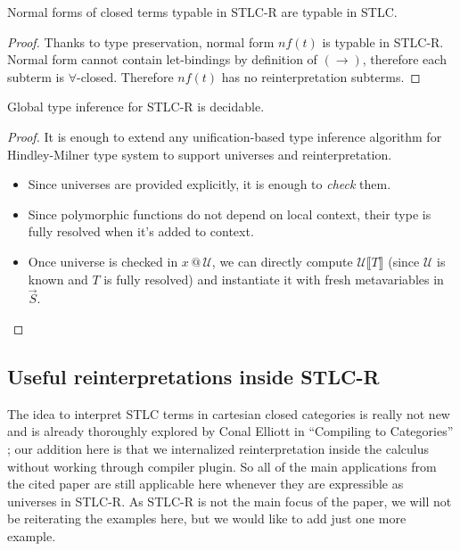 \documentclass[acmsmall, review, screen, authorversion]{acmart}
\begin{document}
\begin{theorem}
    Normal forms of closed terms typable in STLC-R are typable in
    STLC.
\end{theorem}
\begin{proof}
    Thanks to type preservation, normal form $nf(t)$ is typable in
    STLC-R. Normal form cannot contain let-bindings by definition of
    $(\to)$, therefore each subterm is $\forall$-closed. Therefore
    $nf(t)$ has no reinterpretation subterms.
\end{proof}

\begin{theorem}
    Global type inference for STLC-R is decidable.
\end{theorem}
\begin{proof}
    It is enough to extend any unification-based type inference
    algorithm for Hindley-Milner type system to support universes and
    reinterpretation.
    \begin{itemize}
        \item Since universes are provided explicitly, it is enough
            to \textit{check} them.
        \item Since polymorphic functions do not depend on local
            context, their type is fully resolved when it's added to
            context.
        \item Once universe is checked in $x\,@\,\mathcal{U}$, we can
            directly compute $\mathcal{U}\llbracket T\rrbracket$
            (since $\mathcal{U}$ is known and $T$ is fully resolved)
            and instantiate it with fresh metavariables in $\vec{S}$.
    \end{itemize}
\end{proof}

\subsection{Useful reinterpretations inside STLC-R}
\label{STLC-R-applications}

The idea to interpret STLC terms in cartesian closed categories is
really not new and is already thoroughly explored by Conal Elliott in
``Compiling to Categories'' \cite{Elliott:Compcat2017}; our addition
here is that we internalized reinterpretation inside the calculus
without working through compiler plugin. So all of the main
applications from the cited paper are still applicable here whenever
they are expressible as universes in STLC-R. As STLC-R is not the
main focus of the paper, we will not be reiterating the examples
here, but we would like to add just one more example.
\end{document}
